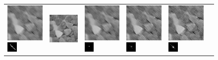 \begin{figure}
\begin{tabular}{|l|l|l|l|l|l|}
\\ 
 \hline\includegraphics[width=2.5cm]{results/candy_kernel3_blurred.png}
\includegraphics[width=0.5cm]{images/kernel3}
& \includegraphics[width=2.5cm]{results/candy_kernel3_nonblind_deconv.png}
&\includegraphics[width=2.5cm]{results/candy_kernel3_MAPxk_x.png}
\includegraphics[width=0.5cm]{results/candy_kernel3_MAPxk_k.png}
&\includegraphics[width=2.5cm]{results/candy_kernel3_MAPk_x.png}
\includegraphics[width=0.5cm]{results/candy_kernel3_MAPk_k.png}
&\includegraphics[width=2.5cm]{results/candy_kernel3_MAPkreg_x.png}
\includegraphics[width=0.5cm]{results/candy_kernel3_MAPkreg_k.png}
\\ 

\end{tabular}
\end{figure}
